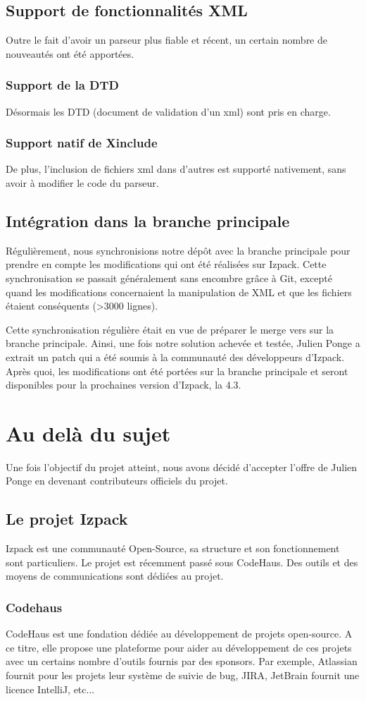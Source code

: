 \subsection{Support de fonctionnalités XML}
Outre le fait d'avoir un parseur plus fiable et récent, un certain nombre de nouveautés ont été apportées.
\subsubsection{Support de la DTD}
Désormais les DTD (document de validation d'un xml) sont pris en charge.
\subsubsection{Support natif de Xinclude}
De plus, l'inclusion de fichiers xml dans d'autres est supporté nativement, sans avoir à modifier le code du parseur.
\subsection{Intégration dans la branche principale}
Régulièrement, nous synchronisions notre dépôt avec la branche principale pour prendre en compte les modifications qui ont été réalisées sur Izpack.
Cette synchronisation se passait généralement sans encombre grâce à Git, excepté quand les modifications concernaient la manipulation de XML et que les fichiers étaient conséquents (>3000 lignes).

Cette synchronisation régulière était en vue de préparer le merge vers sur la branche principale.
Ainsi, une fois notre solution achevée et testée, Julien Ponge a extrait un patch qui a été soumis à la communauté des développeurs d'Izpack.
Après quoi, les modifications ont été portées sur la branche principale et seront disponibles pour la prochaines version d'Izpack, la 4.3.
\section{Au delà du sujet}
Une fois l'objectif du projet atteint, nous avons décidé d'accepter l'offre de Julien Ponge en devenant contributeurs officiels du projet.
\subsection{Le projet Izpack}
Izpack est une communauté Open-Source, sa structure et son fonctionnement sont particuliers. 
Le projet est récemment passé sous CodeHaus. 
Des outils et des moyens de communications sont dédiées au projet.
\subsubsection{Codehaus}
CodeHaus est une fondation dédiée au développement de projets open-source.
A ce titre, elle propose une plateforme pour aider au développement de ces projets avec un certains nombre d'outils fournis par des sponsors.
Par exemple, Atlassian fournit pour les projets leur système de suivie de bug, JIRA, JetBrain fournit une licence IntelliJ, etc...
